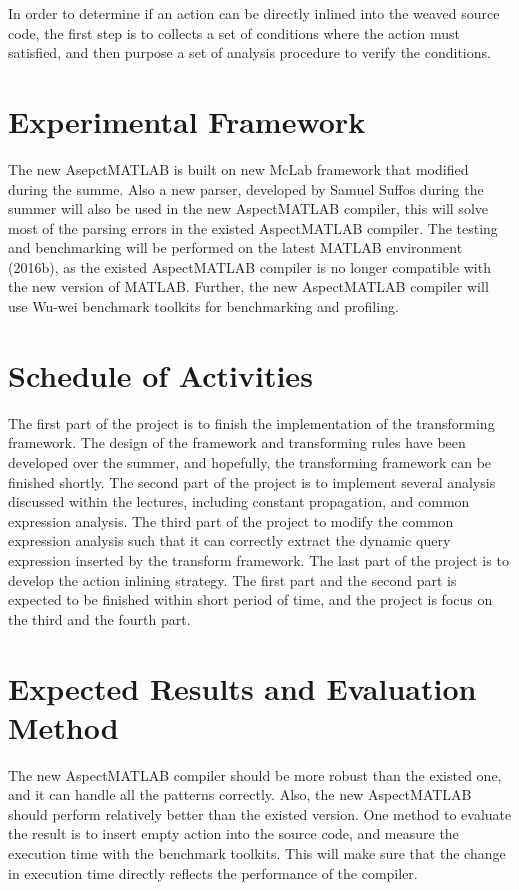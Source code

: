 \documentclass{comp621}
\begin{document}
In order to determine if an action can be directly inlined into the weaved
source code, the first step is to collects a set of conditions where the action
must satisfied, and then purpose a set of analysis procedure to verify the
conditions.

\section{Experimental Framework}

The new AsepctMATLAB is built on new McLab framework that modified during the
summe. Also a new parser\cite{MclabParser}, developed by Samuel Suffos
during the summer will also be used in the new AspectMATLAB compiler, this will
solve most of the parsing errors in the existed AspectMATLAB compiler. The
testing and benchmarking will be performed on the latest MATLAB environment
(2016b), as the existed AspectMATLAB compiler is no longer compatible with the
new version of MATLAB. Further, the new AspectMATLAB compiler will use Wu-wei
benchmark toolkits for benchmarking and profiling.

\section{Schedule of Activities}

The first part of the project is to finish the implementation of the
transforming framework. The design of the framework and transforming rules have
been developed over the summer, and hopefully, the transforming framework can
be finished shortly. The second part of the project is to implement several
analysis discussed within the lectures, including constant propagation, and
common expression analysis. The third part of the project to modify the common
expression analysis such that it can correctly extract the dynamic query
expression inserted by the transform framework. The last part of the project is
to develop the action inlining strategy. The first part and the second part is
expected to be finished within short period of time, and the project is focus
on the third and the fourth part.

\section{Expected Results and Evaluation Method}

The new AspectMATLAB compiler should be more robust than the existed one, and
it can handle all the patterns correctly. Also, the new AspectMATLAB should
perform relatively better than the existed version. One method to evaluate the
result is to insert empty action into the source code, and measure the
execution time with the benchmark toolkits. This will make sure that the change
in execution time directly reflects the performance of the compiler.


% 

\end{document}
